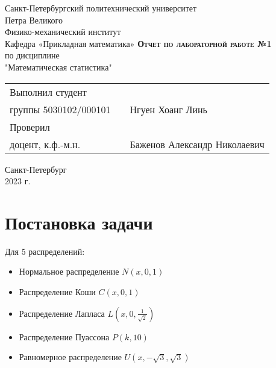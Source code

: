 \documentclass[12pt,a4paper]{article}
\begin{document}
    \begin{titlepage}
        \begin{center}
            \large
            Санкт-Петербургский политехнический университет\\Петра Великого\\
            \vspace{0.5cm}
            Физико-механический институт\\
            \vspace{0.25cm}
            Кафедра «Прикладная математика»
            \vfill
            \textsc{\LARGE\textbf{Отчет по лабораторной работе №1}}\\[5mm]
            \Large
            по дисциплине\\"Математическая статистика"
        \end{center}
        \vfill
        \begin{tabular}{l p{175pt} l}
            Выполнил студент \\ группы 5030102/000101 && Нгуен Хоанг Линь
            \vspace{0.25cm}
            \\Проверил \\ доцент, к.ф.-м.н. && Баженов Александр Николаевич
        \end{tabular}
        \vfill
        \begin{center}
            Санкт-Петербург \\ 2023 г.
        \end{center}
    \end{titlepage}

\newpage
\begin{center}
    \tableofcontents
    \setcounter{page}{2}
\end{center}
\newpage
\begin{center}
    \listoffigures
\end{center}

\newpage
\section{Постановка задачи}
Для 5 распределений:
\begin{itemize}
    \item Нормальное распределение $N(x,0,1)$
    \item Распределение Коши $C(x,0,1)$
    \item Распределение Лапласа $L(x,0,\frac{1}{\sqrt{2}})$
    \item Распределение Пуассона $P(k,10)$
    \item Равномерное распределение $U(x,-\sqrt{3},\sqrt{3})$
\end{itemize}
\end{document}
